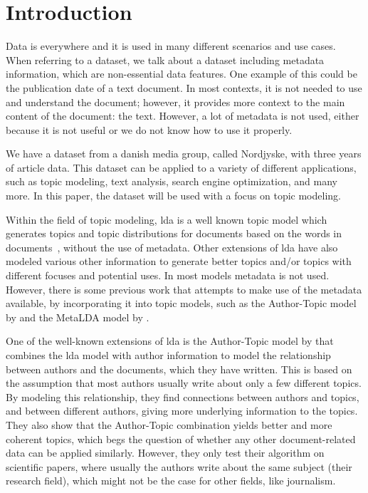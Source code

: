 \section{Introduction}\label{sec:introduction}
Data is everywhere and it is used in many different scenarios and use cases. 
When referring to a dataset, we talk about a dataset including metadata information, which are non-essential data features.
One example of this could be the publication date of a text document. 
In most contexts, it is not needed to use and understand the document; however, it provides more context to the main content of the document: the text.
However, a lot of metadata is not used, either because it is not useful or we do not know how to use it properly.

We have a dataset from a danish media group, called Nordjyske, with three years of article data.
This dataset can be applied to a variety of different applications, such as topic modeling\cite{blei2003latent}\cite{MetaLDA2017}, text analysis\cite{baly2020written}, search engine optimization\cite{amjad2015topic}, and many more.
In this paper, the dataset will be used with a focus on topic modeling.

Within the field of topic modeling, \gls{lda} is a well known topic model which generates topics and topic distributions for documents based on the words in documents~\cite{blei2003latent}, without the use of metadata.
Other extensions of \gls{lda} have also modeled various other information to generate better topics and/or topics with different focuses and potential uses.
In most models metadata is not used.
However, there is some previous work that attempts to make use of the metadata available, by incorporating it into topic models, such as the Author-Topic model by \citet{author_topic_2012} and the MetaLDA model by \citet{MetaLDA2017}.

One of the well-known extensions of \gls{lda} is the Author-Topic model by \citet{author_topic_2012} that combines the \gls{lda} model with author information to model the relationship between authors and the documents, which they have written.
This is based on the assumption that most authors usually write about only a few different topics.
By modeling this relationship, they find connections between authors and topics, and between different authors, giving more underlying information to the topics.
They also show that the Author-Topic combination yields better and more coherent topics, which begs the question of whether any other document-related data can be applied similarly.
However, they only test their algorithm on scientific papers, where usually the authors write about the same subject (their research field), which might not be the case for other fields, like journalism. 

